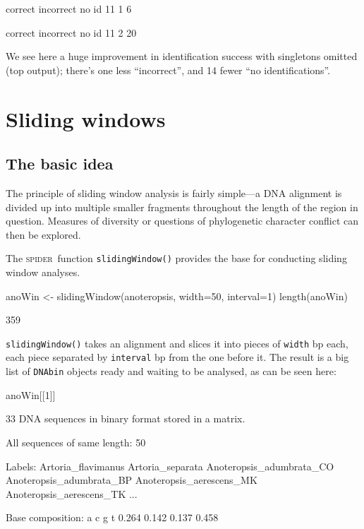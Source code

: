 \documentclass{article}
\newcommand{\spider}{\textsc{spider}} %
\newcommand{\fun}[1]{\texttt{#1}}
\begin{document}
\begin{Routput}
  correct incorrect     no id 
       11         1         6 

  correct incorrect     no id 
       11         2        20 
\end{Routput}

We see here a huge improvement in identification success with singletons omitted (top output); there's one less ``incorrect'', and 14 fewer ``no identifications''.



\section{Sliding windows} 

\subsection{The basic idea}
The principle of sliding window analysis is fairly simple---a DNA alignment is divided up into multiple smaller fragments throughout the length of the region in question. Measures of diversity \citep{Roe.Sper.2007} or questions of phylogenetic character conflict \citep{Crui.2011} can then be explored.

The \spider~function \fun{slidingWindow()} provides the base for conducting sliding window analyses. 

\begin{console}
anoWin <- slidingWindow(anoteropsis, width=50, interval=1)
length(anoWin)
\end{console}

\begin{Routput}
[1] 359
\end{Routput}

\fun{slidingWindow()} takes an alignment and slices it into pieces of \fun{width} bp each, each piece separated by \fun{interval} bp from the one before it. The result is a big list of \fun{DNAbin} objects ready and waiting to be analysed, as can be seen here:

\begin{console}
anoWin[[1]]
\end{console}

\begin{Routput}
33 DNA sequences in binary format stored in a matrix.

All sequences of same length: 50 

Labels: Artoria_flavimanus Artoria_separata Anoteropsis_adumbrata_CO 
Anoteropsis_adumbrata_BP Anoteropsis_aerescens_MK Anoteropsis_aerescens_TK ...

Base composition:
    a     c     g     t 
0.264 0.142 0.137 0.458 
\end{Routput}
\end{document}

